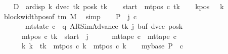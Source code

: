 \begin{isabellebody}
\ \ \isamarkupfalse%
\ {\isacharquery}{\kern0pt}D\ {\isacharequal}{\kern0pt}\ {\isachardoublequoteopen}ar{\isacharunderscore}{\kern0pt}disp\ {\isacharquery}{\kern0pt}k\ {\isacharparenleft}{\kern0pt}dvec\ tk{\isacharparenright}{\kern0pt}\ {\isacharparenleft}{\kern0pt}posk\ tk{\isacharparenright}{\kern0pt}{\isachardoublequoteclose}\isanewline
\ \ \isamarkupfalse%
\ {\isacharquery}{\kern0pt}start\ {\isacharequal}{\kern0pt}\ {\isachardoublequoteopen}mt{\isacharunderscore}{\kern0pt}pos\ c{}\ tk{\isachardoublequoteclose}\isanewline
\ \ \isamarkupfalse%
\ kpos{\isacharcolon}{\kern0pt}\ {\isachardoublequoteopen}{}\ {\isacharless}{\kern0pt}\ {\isacharquery}{\kern0pt}k{\isachardoublequoteclose}\ \isamarkupfalse%
\ block{\isacharunderscore}{\kern0pt}width{\isacharunderscore}{\kern0pt}pos{\isacharbrackleft}{\kern0pt}of\ {\isachardoublequoteopen}{\isasymGamma}{\isacharunderscore}{\kern0pt}tm\ M{\isachardoublequoteclose}{\isacharbrackright}{\kern0pt}\ \isamarkupfalse%
\ simp\isanewline
\ \ \isamarkupfalse%
\ {\isacharquery}{\kern0pt}P\ {\isacharequal}{\kern0pt}\ {\isachardoublequoteopen}{\isasymlambda}j\ c{\isachardot}{\kern0pt}\isanewline
\ \ \ \ \ \ \ mt{\isacharunderscore}{\kern0pt}state\ c\ {\isacharequal}{\kern0pt}\ {\isacharparenleft}{\kern0pt}q{\isacharcomma}{\kern0pt}\ AR{\isacharunderscore}{\kern0pt}SimAdvance{\isacharcomma}{\kern0pt}\ tk{\isacharcomma}{\kern0pt}\ j{\isacharcomma}{\kern0pt}\ buf{\isacharcomma}{\kern0pt}\ dvec{\isacharcomma}{\kern0pt}\ posk{\isacharparenright}{\kern0pt}\isanewline
\ \ \ \ \ {\isasymand}\ mt{\isacharunderscore}{\kern0pt}pos\ c\ tk\ {\isacharequal}{\kern0pt}\ {\isacharquery}{\kern0pt}start\ {\isacharminus}{\kern0pt}\ j\isanewline
\ \ \ \ \ {\isasymand}\ mt{\isacharunderscore}{\kern0pt}tape\ c\ {\isacharequal}{\kern0pt}\ mt{\isacharunderscore}{\kern0pt}tape\ c{}\isanewline
\ \ \ \ \ {\isasymand}\ {\isacharparenleft}{\kern0pt}{\isasymforall}k{\isacharprime}{\kern0pt}{\isachardot}{\kern0pt}\ k{\isacharprime}{\kern0pt}\ {\isasymnoteq}\ tk\ {\isasymlongrightarrow}\ mt{\isacharunderscore}{\kern0pt}pos\ c\ k{\isacharprime}{\kern0pt}\ {\isacharequal}{\kern0pt}\ mt{\isacharunderscore}{\kern0pt}pos\ c{}\ k{\isacharprime}{\kern0pt}{\isacharparenright}{\kern0pt}{\isachardoublequoteclose}\isanewline
\ \ \isamarkupfalse%
\ mybase{\isacharcolon}{\kern0pt}\ {\isachardoublequoteopen}{\isacharquery}{\kern0pt}P\ {}\ c{}{\isachardoublequoteclose}\ \isamarkupfalse%

\end{isabellebody}
